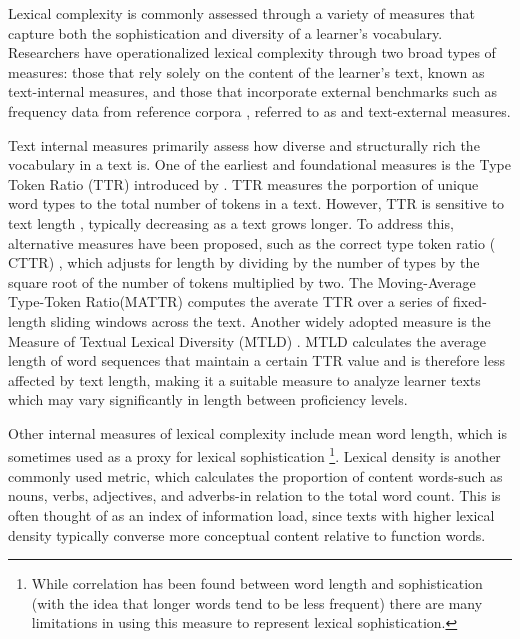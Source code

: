 
Lexical complexity is commonly assessed through a variety of measures that capture both the sophistication and
diversity of a learner's vocabulary. Researchers have operationalized lexical complexity through two broad types of
measures: those that rely solely on the content of the learner's text, known as
text-internal measures, and those that incorporate external benchmarks such as frequency data from reference
corpora , referred to as and text-external measures\citep{Butle2012}.

Text internal measures primarily assess how diverse and structurally rich the vocabulary in a text is.
One of the
earliest
and
foundational measures is the Type Token Ratio (TTR) introduced by \citet{Templin1957}. TTR measures the porportion of
unique word types to the total number of tokens in a text. However, TTR is sensitive to text
length
\citep{koizumi2012}, typically decreasing as a text grows longer. To address this, alternative measures have been
proposed, such as the correct type token ratio (
CTTR)
\citep{Carroll1964}, which adjusts for length by dividing by the number of types by the square root of the
number of tokens multiplied by two. The Moving-Average Type-Token Ratio(MATTR)\citep{Covington2010} computes the
averate TTR over a series of fixed-length sliding windows across the text. Another widely
adopted measure is the Measure of Textual Lexical Diversity (MTLD)
\citep{McCarthy2010}. MTLD
calculates the average length of word
sequences that maintain a certain TTR value and is therefore less affected by text length, making it a suitable
measure to analyze learner texts which may vary significantly in length between proficiency levels.

Other internal measures
 of lexical complexity include
mean word length, which is sometimes used as a proxy for lexical sophistication
\footnote{ While correlation has been found between word length and sophistication (with the idea that longer words
tend to be less frequent) there are many limitations in using this measure to represent lexical sophistication.\citep{Laufer1995}}.
Lexical density is another commonly used metric, which calculates the proportion
of content words-such as nouns, verbs, adjectives, and adverbs-in relation to the total word count. This is often
thought of as an index of information load, since texts with higher lexical density typically converse more
conceptual content relative to function words.

